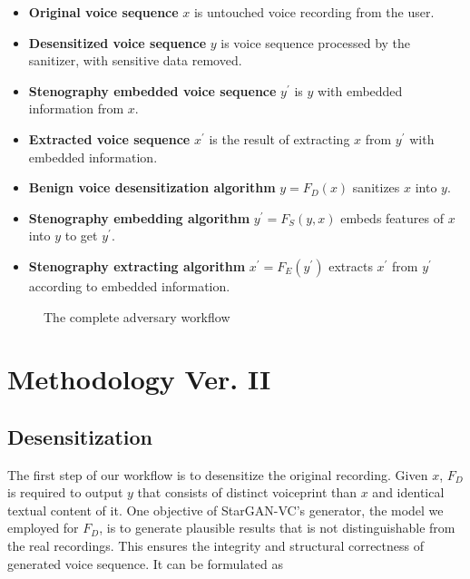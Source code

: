\documentclass[journal]{IEEEtran} %
\begin{document}
\begin{itemize}
    \item \textbf{Original voice sequence} $x$ is untouched voice recording from the user.
    \item \textbf{Desensitized voice sequence} $y$ is voice sequence processed by the sanitizer, with sensitive data removed.
    \item \textbf{Stenography embedded voice sequence} $y^{\prime}$ is $y$ with embedded information from $x$.
    \item \textbf{Extracted voice sequence} $x^{\prime}$ is the result of extracting $x$ from $y^{\prime}$ with embedded information.
    \item \textbf{Benign voice desensitization algorithm} $y = F_D(x)$ sanitizes $x$ into $y$.
    \item \textbf{Stenography embedding algorithm} $y^{\prime} = F_S(y, x)$ embeds features of $x$ into $y$ to get $y^{\prime}$.
    \item \textbf{Stenography extracting algorithm} $x^{\prime} = F_E(y^{\prime})$ extracts $x^{\prime}$ from $y^{\prime}$ according to embedded information.
\end{itemize}

\begin{figure}[!t]
    \caption{The complete adversary workflow}
    \label{fig:method}
\end{figure}

\label{seg:method}
\section{Methodology Ver. II}

\subsection{Desensitization}

The first step of our workflow is to desensitize the original recording. Given $x$, $F_D$ is required to output $y$ that consists of distinct voiceprint than $x$ and identical textual content of it. One objective of StarGAN-VC's generator, the model we employed for $F_D$, is to generate plausible results that is not distinguishable from the real recordings. This ensures the integrity and structural correctness of generated voice sequence. It can be formulated as
\end{document}
